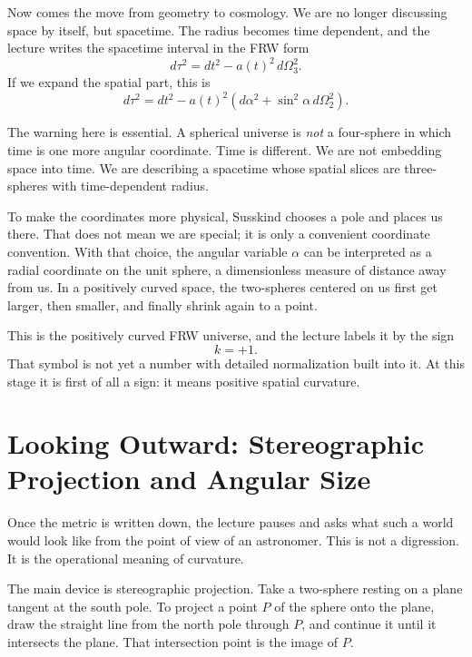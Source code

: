Now comes the move from geometry to cosmology. We are no longer discussing space by itself, but spacetime. The radius becomes time dependent, and the lecture writes the spacetime interval in the FRW form
\begin{equation}
d\tau^2=dt^2-a(t)^2\,d\Omega_3^2.
\end{equation}
If we expand the spatial part, this is
\begin{equation}
d\tau^2=dt^2-a(t)^2\left(d\alpha^2+\sin^2\alpha\,d\Omega_2^2\right).
\end{equation}

The warning here is essential. A spherical universe is \emph{not} a four-sphere in which time is one more angular coordinate. Time is different. We are not embedding space into time. We are describing a spacetime whose spatial slices are three-spheres with time-dependent radius.

To make the coordinates more physical, Susskind chooses a pole and places us there. That does not mean we are special; it is only a convenient coordinate convention. With that choice, the angular variable \(\alpha\) can be interpreted as a radial coordinate on the unit sphere, a dimensionless measure of distance away from us. In a positively curved space, the two-spheres centered on us first get larger, then smaller, and finally shrink again to a point.

This is the positively curved FRW universe, and the lecture labels it by the sign
\begin{equation}
k=+1.
\end{equation}
That symbol is not yet a number with detailed normalization built into it. At this stage it is first of all a sign: it means positive spatial curvature.

\section{Looking Outward: Stereographic Projection and Angular Size}

Once the metric is written down, the lecture pauses and asks what such a world would look like from the point of view of an astronomer. This is not a digression. It is the operational meaning of curvature.

The main device is stereographic projection. Take a two-sphere resting on a plane tangent at the south pole. To project a point \(P\) of the sphere onto the plane, draw the straight line from the north pole through \(P\), and continue it until it intersects the plane. That intersection point is the image of \(P\).


